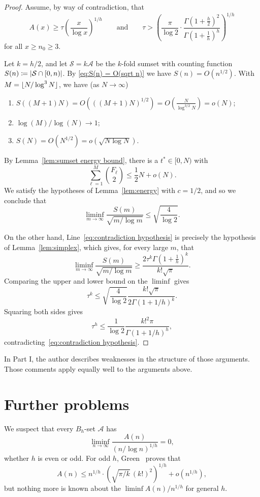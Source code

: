 \documentclass[10pt,letterpaper]{article}
\newcommand{\cA}{\mathcal{A}}
\newcommand{\cS}{\mathcal{S}}
\DeclarePairedDelimiter{\abs}{\lvert}{\rvert}
\DeclarePairedDelimiter{\floor}{\lfloor}{\rfloor}
\theoremstyle{remark}
\begin{document}
\begin{proof}
Assume, by way of contradiction, that
  \begin{equation}\label{eq:contradiction hypothesis}
    A(x) \ge \tau \left(\frac{x}{\log x}\right)^{1/h}
    \qquad \text{and} \qquad
    \tau >
    \left(\frac{\pi}{\log 2} \cdot \frac{\Gamma(1+\tfrac h2)^2}{\Gamma(1+\tfrac1h)^{h}}\right)^{1/h}
  \end{equation}
for all $x\ge n_0\ge 3$.

Let $k=h/2$, and let $\cS=k\cA$ be the $k$-fold sumset with counting function $S(n)\coloneqq \abs{\cS\cap[0,n)}$. By \eqref{eq:S(n) = O(sqrt n)} we have $S(n)=O(n^{1/2})$. With $M=\floor{N/\log^3 N}$, we have (as $N\to \infty$)
\begin{enumerate}[label=\textit{(\roman*)},noitemsep]
  \item $S((M+1)N)= O(((M+1)N)^{1/2}) = O(\frac{N}{\log^{3/2} N}) = o(N)$;
  \item $\log(M)/\log(N) \to 1$;
  \item $S(N) = O(N^{1/2}) = o(\sqrt{N\log N})$.
\end{enumerate}
By Lemma~\ref{lem:sumset energy bound}, there is a $t^\ast\in[0,N)$ with
  \[\sum_{\ell=1}^M \binom{F_\ell}{2} \le \frac12 N + o(N).\]
We satisfy the hypotheses of Lemma~\ref{lem:energy} with $c=1/2$, and so we conclude that
  \[\liminf_{m\to\infty} \frac{S(m)}{\sqrt{m/\log m}} \le \sqrt{\frac{4}{\log 2}}.\]
 
On the other hand, Line~\eqref{eq:contradiction hypothesis} is precisely the hypothesis of Lemma~\ref{lem:simplex}, which gives, for every large $m$, that
  \[\liminf_{m\to\infty} \frac{S(m)}{\sqrt{m/\log m}} \ge \frac{2\tau^k \Gamma(1+\tfrac1h)^k}{k!\sqrt{\pi}}.\]
Comparing the upper and lower bound on the $\liminf$ gives
  \[\tau^k \le \sqrt{\frac{4}{\log 2}} \frac{k!\sqrt{\pi}}{2\Gamma(1+1/h)^k}.\]
Squaring both sides gives
  \[\tau^h \le \frac{1}{\log 2} \frac{k!^2 \pi}{\Gamma(1+1/h)^h},\]
contradicting~\eqref{eq:contradiction hypothesis}.
\end{proof}

In Part I, the author describes weaknesses in the structure of those arguments. Those comments apply equally well to the arguments above.

\section{Further problems}\label{sec:problems}
We suspect that every $B_h$-set $\cA$ has
  \[\liminf_{n\to\infty} \frac{A(n)}{(n/\log n)^{1/h}} = 0,\]
whether $h$ is even or odd. 
For odd $h$, Green~\cite{2001.Green} proves that
  \[{A(n)}\le {n^{1/h}} \cdot (\sqrt{\pi/k}\,(k!)^2)^{1/h}+o(n^{1/h}),\]
but nothing more is known about the $\liminf A(n)/n^{1/h}$ for general $h$.
\end{document}
